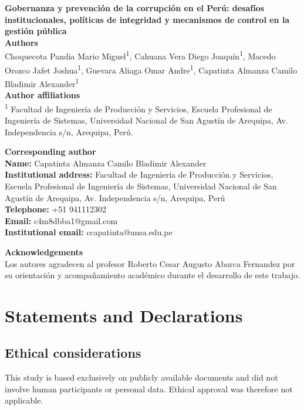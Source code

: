 \documentclass[12pt,a4paper]{article}
\begin{document}
\begin{center}
{\Large\bfseries Gobernanza y prevención de la corrupción en el Perú: desafíos institucionales, políticas de integridad y mecanismos de control en la gestión pública}\\[1.5em]
\textbf{Authors}\\
Choquecota Pandia Mario Miguel\textsuperscript{1}, Cahuana Vera Diego Joaquín\textsuperscript{1}, Macedo Orozco Jafet Joshua\textsuperscript{1}, Guevara Aliaga Omar Andre\textsuperscript{1}, Capatinta Almanza Camilo Bladimir Alexander\textsuperscript{1}\\[0.75em]
\textbf{Author affiliations}\\
\textsuperscript{1} Facultad de Ingeniería de Producción y Servicios, Escuela Profesional de Ingeniería de Sistemas, Universidad Nacional de San Agustín de Arequipa, Av. Independencia s/n, Arequipa, Perú.
\end{center}

\vspace{1.5em}
\noindent\textbf{Corresponding author}\\
\textbf{Name:} Capatinta Almanza Camilo Bladimir Alexander\\
\textbf{Institutional address:} Facultad de Ingeniería de Producción y Servicios, Escuela Profesional de Ingeniería de Sistemas, Universidad Nacional de San Agustín de Arequipa, Av. Independencia s/n, Arequipa, Perú\\
\textbf{Telephone:} +51 941112302\\
\textbf{Email:} c4m8dbba1@gmail.com\\
\textbf{Institutional email:} ccapatinta@unsa.edu.pe

\vspace{1em}
\noindent\textbf{Acknowledgements}\\
Los autores agradecen al profesor Roberto Cesar Augusto Abarca Fernandez por su orientación y acompañamiento académico durante el desarrollo de este trabajo.

\section*{Statements and Declarations}
\subsection*{Ethical considerations}
This study is based exclusively on publicly available documents and did not involve human participants or personal data. Ethical approval was therefore not applicable.
\end{document}
